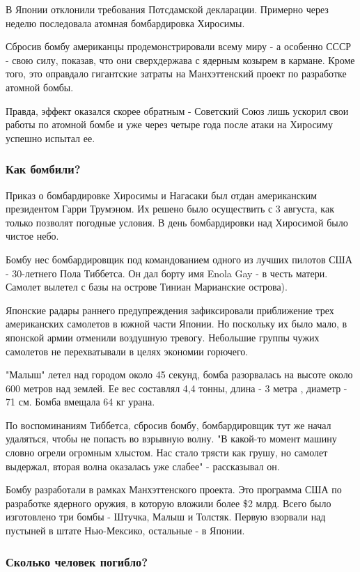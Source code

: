 В Японии отклонили требования Потсдамской декларации. Примерно через неделю
последовала атомная бомбардировка Хиросимы. 

Сбросив бомбу американцы продемонстрировали всему миру - а особенно СССР - свою
силу, показав, что они сверхдержава с ядерным козырем в кармане. Кроме того,
это оправдало гигантские затраты на Манхэттенский проект по разработке атомной
бомбы. 

Правда, эффект оказался скорее обратным - Советский Союз лишь ускорил свои
работы по атомной бомбе и уже через четыре года после атаки на Хиросиму успешно
испытал ее. 

\subsubsection{Как бомбили?}

Приказ о бомбардировке Хиросимы и Нагасаки был отдан американским президентом
Гарри Трумэном. Их решено было осуществить с 3 августа, как только позволят
погодные условия. В день бомбардировки над Хиросимой было чистое небо.

Бомбу нес бомбардировщик под командованием одного из лучших пилотов США -
30-летнего Пола Тиббетса. Он дал борту имя Enola Gay  - в честь матери. Самолет
вылетел с базы на острове Тиниан Марианские острова).

Японские радары раннего предупреждения зафиксировали приближение трех
американских самолетов в южной части Японии. Но поскольку их было мало, в
японской армии отменили воздушную тревогу. Небольшие группы чужих самолетов не
перехватывали в целях экономии горючего.

"Малыш" летел над городом около 45 секунд, бомба разорвалась на высоте около
600 метров над землей. Ее вес составлял 4,4 тонны, длина - 3 метра , диаметр -
71 см. Бомба вмещала 64 кг урана.

По воспоминаниям Тиббетса, сбросив бомбу, бомбардировщик тут же начал
удаляться, чтобы не попасть во взрывную волну. "В какой-то момент машину словно
огрели огромным хлыстом. Нас стало трясти как грушу, но самолет выдержал,
вторая волна оказалась уже слабее" - рассказывал он.

Бомбу разработали в рамках Манхэттенского проекта. Это программа США по
разработке ядерного оружия, в которую вложили более \$2 млрд. Всего было
изготовлено три бомбы - Штучка, Малыш и Толстяк. Первую взорвали над пустыней в
штате Нью-Мексико, остальные - в Японии.

\subsubsection{Сколько человек погибло?}

